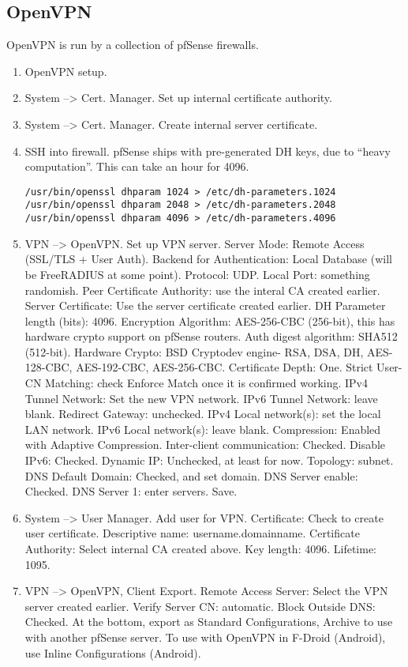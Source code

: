 \subsection{OpenVPN}
OpenVPN is run by a collection of pfSense firewalls.

\begin{enumerate}
 \item OpenVPN setup.
 \item System --> Cert. Manager. Set up internal certificate authority.
 \item System --> Cert. Manager. Create internal server certificate.
 \item SSH into firewall. pfSense ships with pre-generated DH keys, due to ``heavy computation''. This can take an hour for 4096.
\begin{verbatim}
/usr/bin/openssl dhparam 1024 > /etc/dh-parameters.1024
/usr/bin/openssl dhparam 2048 > /etc/dh-parameters.2048
/usr/bin/openssl dhparam 4096 > /etc/dh-parameters.4096
\end{verbatim}
 \item VPN --> OpenVPN. Set up VPN server. Server Mode: Remote Access (SSL/TLS + User Auth). Backend for Authentication: Local Database (will be FreeRADIUS at some point). Protocol: UDP. Local Port: something randomish. Peer Certificate Authority: use the interal CA created earlier. Server Certificate: Use the server certificate created earlier. DH Parameter length (bits): 4096. Encryption Algorithm: AES-256-CBC (256-bit), this has hardware crypto support on pfSense routers. Auth digest algorithm: SHA512 (512-bit). Hardware Crypto: BSD Cryptodev engine- RSA, DSA, DH, AES-128-CBC, AES-192-CBC, AES-256-CBC. Certificate Depth: One. Strict User-CN Matching: check Enforce Match once it is confirmed working. IPv4 Tunnel Network: Set the new VPN network. IPv6 Tunnel Network: leave blank. Redirect Gateway: unchecked.  IPv4 Local network(s): set the local LAN network. IPv6 Local network(s): leave blank. Compression: Enabled with Adaptive Compression. Inter-client communication: Checked. Disable IPv6: Checked. Dynamic IP: Unchecked, at least for now. Topology: subnet. DNS Default Domain: Checked, and set domain. DNS Server enable: Checked. DNS Server 1: enter servers. Save.
 \item System --> User Manager. Add user for VPN. Certificate: Check to create user certificate. Descriptive name: username.domainname. Certificate Authority: Select internal CA created above. Key length: 4096. Lifetime: 1095.
 \item VPN --> OpenVPN, Client Export. Remote Access Server: Select the VPN server created earlier. Verify Server CN: automatic. Block Outside DNS: Checked. At the bottom, export as Standard Configurations, Archive to use with another pfSense server. To use with OpenVPN in F-Droid (Android), use Inline Configurations (Android).
\end{enumerate}


